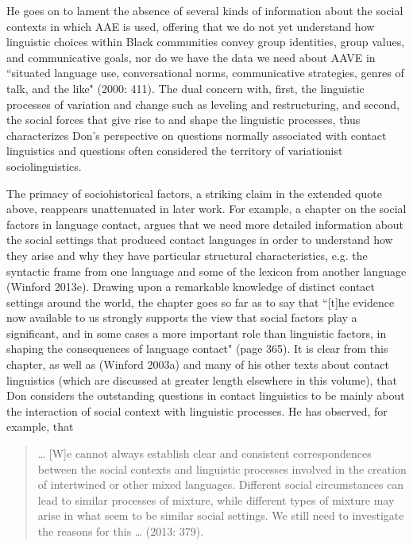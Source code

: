 \documentclass[output=paper, colorlinks,citecolor=brown]{langscibook}
\begin{document}
He goes on to lament the absence of several kinds of information about the social contexts in which AAE is used, offering that we do not yet understand how linguistic choices within Black communities convey group identities, group values, and communicative goals, nor do we have the data we need about AAVE in “situated language use, conversational norms, communicative strategies, genres of talk, and the like" (2000: 411). The dual concern with, first, the linguistic processes of variation and change such as leveling and restructuring, and second, the social forces that give rise to and shape the linguistic processes, thus characterizes Don's perspective on questions normally associated with contact linguistics and questions often considered the territory of variationist sociolinguistics. 

The primacy of sociohistorical factors, a striking claim in the extended quote above, reappears unattenuated in later work. For example, a chapter on the social factors in language contact, argues that we need more detailed information about the social settings that produced contact languages in order to understand how they arise and why they have particular structural characteristics, e.g. the syntactic frame from one language and some of the lexicon from another language (Winford 2013e). Drawing upon a remarkable knowledge of distinct contact settings around the world, the chapter goes so far as to say that “[t]he evidence now available to us strongly supports the view that social factors play a significant, and in some cases a more important role than linguistic factors, in shaping the consequences of language contact" (page 365). It is clear from this chapter, as well as (Winford 2003a) and many of his other texts about contact linguistics (which are discussed at greater length elsewhere in this volume), that Don considers the outstanding questions in contact linguistics to be mainly about the interaction of social context with linguistic processes. He has observed, for example, that 

\begin{quote}
    … [W]e cannot always establish clear and consistent correspondences between the social contexts and linguistic processes involved in the creation of intertwined or other mixed languages. Different social circumstances can lead to similar processes of mixture, while different types of mixture may arise in what seem to be similar social settings. We still need to investigate the reasons for this … (2013: 379).
\end{quote}
\end{document}
